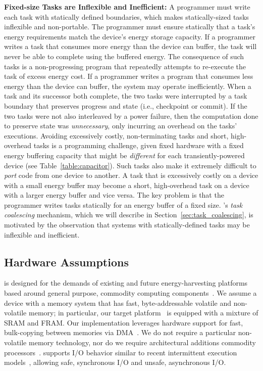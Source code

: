 \noindent \textbf{Fixed-size Tasks are Inflexible and Inefficient:} A programmer must write each task with statically defined boundaries, which makes statically-sized tasks inflexible and non-portable. The programmer must ensure statically that a task's energy requirements match the device's energy storage capacity. If a programmer writes a task that consumes more energy than the device can buffer, the task will never be able to complete using the buffered energy. The consequence of such tasks is a non-progressing program that repeatedly attempts to re-execute the task of excess energy cost. If a programmer writes a program that consumes less energy than the device can buffer, the system may operate inefficiently. When a task and its successor both complete, the two tasks were interrupted by a task boundary that preserves progress and state (i.e., checkpoint or commit).  If the two tasks were not also interleaved by a power failure, then the computation done to preserve state was {\em unnecessary}, only incurring an overhead on the tasks' executions. Avoiding excessively costly, non-terminating tasks and short, high-overhead tasks is a programming challenge, given fixed hardware with a fixed energy buffering capacity that might be \emph{different} for each transiently-powered device (see Table~\ref{table:capacitor}). Such tasks also make it extremely difficult to {\em port} code from  one device to another. A task that is excessively costly on a device with a small energy buffer may become a short, high-overhead task on a device with a larger energy buffer and vice versa. The key problem is that the programmer writes tasks statically for an energy buffer of a fixed size. \sys's {\em task coalescing} mechanism, which we will describe in Section~\ref{sec:task_coalescing}, is motivated by the observation that systems with statically-defined tasks may be inflexible and inefficient. 

\subsection{Hardware Assumptions}
\label{sec:background_hardware}

\sys is designed for the demands of existing and future energy-harvesting platforms based around general purpose, commodity computing components~\cite{wisp,msp430datasheet}. We assume a device with a memory system that has fast, byte-addressable volatile and non-volatile memory; in particular, our target platform~\cite{wisp} is equipped with a mixture of SRAM and FRAM. Our implementation leverages hardware support for fast, bulk-copying between memories via DMA~\cite{msp430datasheet}. We do not require a particular non-volatile memory technology, nor do we require architectural additions commodity processors~\cite{su_date_2017,ratchet,quickrecall,nvp}. \sys supports I/O behavior similar to recent intermittent execution models~\cite{alpaca,chain}, allowing safe, synchronous I/O and unsafe, asynchronous I/O.
